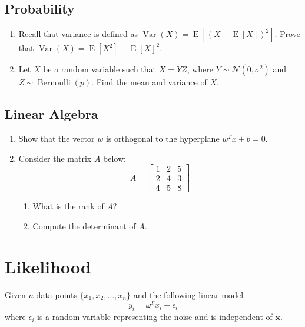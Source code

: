 \documentclass[11pt]{article}
\DeclareMathOperator{\Bernoulli}{Bernoulli}
\DeclareMathOperator{\E}{E}
\DeclareMathOperator{\Var}{Var}
\begin{document}
\subsection*{Probability}
\begin{enumerate}
\item Recall that variance is defined as $\Var(X) = \E[(X - \E[X])^2]$. Prove that $\Var(X) = \E[X^2] - \E[X]^2$.

\item Let $X$ be a random variable such that $X = YZ$, where $Y \sim \mathcal{N}(0,\sigma^2)$ and $Z \sim \Bernoulli(p)$. Find the mean and variance of $X$.
\end{enumerate}

\subsection*{Linear Algebra}
\begin{enumerate}
\item Show that the vector $w$ is orthogonal to the hyperplane $w^T x + b = 0$.

\item Consider the matrix $A$ below:
\begin{equation*}
A = 
\begin{bmatrix}
1 & 2 & 5\\
2 & 4 & 3\\
4 & 5 & 8
\end{bmatrix}
\end{equation*}
\begin{enumerate}
\item What is the rank of $A$?
\item Compute the determinant of $A$.
\end{enumerate}
\end{enumerate}


\pagebreak
\section{Likelihood}
Given $n$ data points $\{x_1, x_2, \dots, x_n\}$ and the following linear model 
$$y_i = \omega^Tx_i + \epsilon_i$$
where $\epsilon_i$ is a random variable representing the noise and is independent of $\textbf{x}$.
\end{document}
